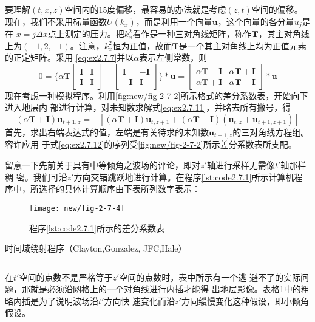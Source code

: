 要理解$(t,x,z)$空间内的$15$度偏移，最容易的办法就是考虑$(z,t)$空间的偏移。
现在，我们不采用标量函数$U(k_x)$，而是利用一个向量$\mathbf{u}$，这个向量的各分量$u_j$是在
$x=j\Delta x$点上测定的压力。把$k_x^2$看作是一种三对角线矩阵，称作$\mathbf{T}$，其主对角线上为$(-1,
2,-1)$。注意，$k_x^2$恒为正值，故而$\mathbf{T}$是一个其主对角线上均为正值元素的正定矩阵。采用
\ref{eq:ex2.7.7}并以$\alpha$表示左侧常数，则
\begin{equation}
0 = \{
\alpha\mathbf{T}
\begin{bmatrix}
\mathbf{I}&\mathbf{I}\\
\mathbf{I}&\mathbf{I}
\end{bmatrix}
-
\begin{bmatrix}
\mathbf{I}&-\mathbf{I}\\
-\mathbf{I}&\mathbf{I}
\end{bmatrix}
\}*\mathbf{u}
=
\begin{bmatrix}
\alpha\mathbf{T}-\mathbf{I}&\alpha\mathbf{T}+\mathbf{I}\\
\alpha\mathbf{T}+\mathbf{I}&\alpha\mathbf{T}-\mathbf{I}
\end{bmatrix}*\mathbf{u}
\label{eq:ex2.7.11}
\end{equation}
现在考虑一种模拟程序。利用\ref{fig:new/fig-2-7-2}所示格式的差分系数表，开始向下进入地层内
部进行计算，对未知数求解式\ref{eq:ex2.7.11}，并略去所有撇号，得
\begin{equation}
(\alpha\mathbf{T}+\mathbf{I})
\mathbf{u}_{t+1,z}=
-[
(\alpha\mathbf{T}+\mathbf{I})
\mathbf{u}_{t,z+1}+
(\alpha\mathbf{T}-\mathbf{I})
(\mathbf{u}_{t,z}+\mathbf{u}_{t+1,z+1})
]
\label{eq:ex2.7.12}
\end{equation}
首先，求出右端表达式的值，左端是有关待求的未知数$\mathbf{u}_{t+1,z}$的三对角线方程组。容许应用
于式\ref{eq:ex2.7.12}的序列受\ref{fig:new/fig-2-7-2}所示差分系数表所支配。

留意一下先前关于具有中等倾角之波场的评论，即对$z'$轴进行采样无需像$t'$轴那样稠
密。我们可沿$z'$方向交错跳跃地进行计算。在程序\ref{lst:code2.7.1}所示计算机程序中，所选择的具体计算顺序由下表所列数字表示：
\begin{figure}[H]
\centering
\texttt{[image: new/fig-2-7-4]}
\caption{程序\ref{lst:code2.7.1}所示的差分系数表}
\label{fig:new/fig-2-7-4}
\end{figure}
\begin{listing}[H]
    \caption{时间域绕射程序（Clayton,Gonzalez,
JFC,Hale）}
    \inputminted{Fortran}{code2-7-1.f90}
    \label{lst:code2.7.1}
\end{listing}
在$t'$空间的点数不是严格等于$z'$空间的点数时，表中所示有一个逃
避不了的实际问题，那就是必须沿网格上的一个对角线进行内插才能得
出地层影像。表格\ref{fig:new/fig-2-7-4}中的粗略内插是为了说明波场沿$t'$方向快
速变化而沿$z'$方同缓慢变化这种假设，即小倾角假设。

